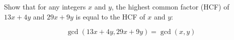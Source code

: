 Show that for any integers $x$ and $y$, the highest common factor (HCF) of $13x+4y$ and $29x+9y$ is equal to the HCF of $x$ and $y$:

\[
\gcd(13x+4y, 29x+9y) = \gcd(x, y)
\]
